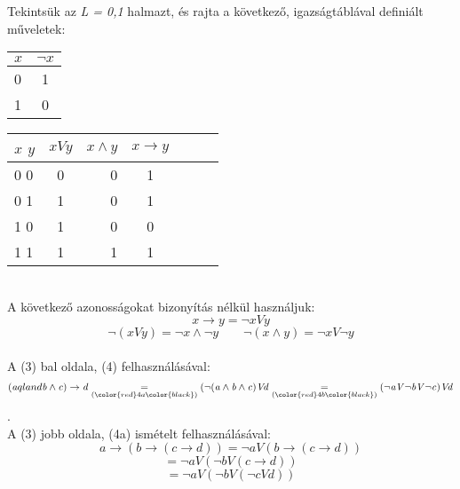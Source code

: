 \documentclass{article}
\begin{document}
Tekintsük az \textit{L = {0,1}} halmazt, és rajta a következő, igazságtáblával definiált műveletek:
\begin{table}[h!]
\begin{subtable}{.5\linewidth}
  \begin{center}
    \begin{tabular}{l||c} 
      $x$ & $\neg x$\\
      \hline
      0 & 1\\
      1 & 0\\
    \end{tabular}
  \end{center}
\end{subtable}
\begin{subtable}{0.5\linewidth}
  \begin{center}
    \begin{tabular}{l||c|r|c|c|c|c}
      $\mathit{x}$ $\mathit{y}$ & $\mathit{xVy}$ & $\mathit{x\land y}$ & $\mathit{x\rightarrow y}$\\
      \hline
      0 0 & 0 & 0 & 1\\ 
      0 1 & 1 & 0 & 1\\
      1 0 & 1 & 0 & 0\\
      1 1 & 1 & 1 & 1\\
    \end{tabular}
  \end{center}
\end{subtable}
\end{table}
\\A következő azonosságokat bizonyítás nélkül használjuk:\[\mathit{x}\rightarrow\mathit{y} =\neg\mathit{xVy}\]\[\neg(\mathit{xVy})=\neg\mathit{x}\land\neg\mathit{y}\qquad	\neg(\mathit{x}\land\mathit{y})=\neg\mathit{xV}\neg\mathit{y}\]
\\A (\color{red}3\color{black}) bal oldala, (\color{red}4\color{black}) felhasználásával: \[(\mathit{a}qland\mathit{b}\land\mathit{c})\rightarrow\mathit{d} \underset{(\color{red}4a\color{black})}{=}(\neg(\mathit{a\land b\land c})\mathit{Vd}\underset{(\color{red}4b\color{black})}{=} (\neg\mathit{aV}\neg\mathit{bV}\neg\mathit{c})\mathit{Vd}\]. 
\\A (\color{red}3\color{black}) jobb oldala, (\color{red}4a\color{black}) ismételt felhasználásával: \[a\rightarrow(b\rightarrow(c\rightarrow d)) = \neg a\mathit{V}(b\rightarrow(c\rightarrow d))\] \[= \neg a\mathit{V(\neg b\mathit{V}(c\rightarrow d))}\]  \[= \neg a\mathit{V}(\neg b\mathit{V}(\neg c\mathit{V}d))\]
\end{document}
